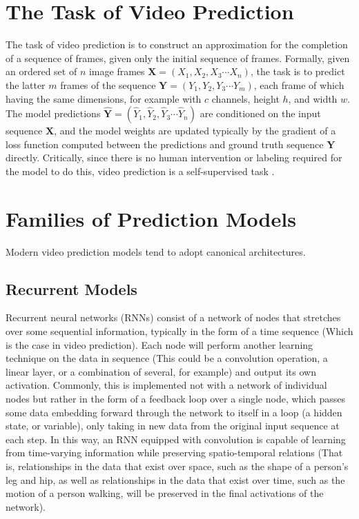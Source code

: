 \documentclass{scrartcl}
\begin{document}
\section{The Task of Video Prediction}
\label{sec:task}

\newcommand{\Xseq}{$\boldsymbol{X} = \left( X_1 , X_2 , X_3 \cdots X_n \right)$}
\newcommand{\Yseq}{$\boldsymbol{Y} = \left( Y_1 , Y_2 , Y_3 \cdots Y_m \right)$}
\newcommand{\Yhatseq}{
	$\hat{\boldsymbol{Y}} = 
	\left( \hat{Y}_1 , \hat{Y}_2 , \hat{Y}_3 \cdots \hat{Y}_n \right)$
}

The task of video prediction is to construct an approximation for the
completion of a sequence of frames, given only the initial sequence of frames.
Formally, given an ordered set of $n$ image frames \Xseq, the task is to
predict the latter $m$ frames of the sequence \Yseq, each frame of which having
the same dimensions, for example with $c$ channels, height $h$, and width $w$.
The model predictions \Yhatseq are conditioned on the input sequence
$\boldsymbol{X}$, and the model weights are updated typically by the gradient
of a loss function computed between the predictions and ground truth sequence
$\boldsymbol{Y}$ directly. Critically, since there is no human intervention or
labeling required for the model to do this, video prediction is a
self-supervised task \cite{video_prediction_survey}.

\section{Families of Prediction Models}
\label{sec:families}

Modern video prediction models tend to adopt canonical architectures.

\subsection{Recurrent Models}
\label{subsec:recurrent}

Recurrent neural networks (RNNs) consist of a network of nodes that stretches
over some sequential information, typically in the form of a time sequence
(Which is the case in video prediction). Each node will perform another
learning technique on the data in sequence (This could be a convolution
operation, a linear layer, or a combination of several, for example) and output
its own activation. Commonly, this is implemented not with a network of
individual nodes but rather in the form of a feedback loop over a single node,
which passes some data embedding forward through the network to itself in a
loop (a hidden state, or variable), only taking in new data from the original
input sequence at each step. In this way, an RNN equipped with convolution is
capable of learning from time-varying information while preserving
spatio-temporal relations (That is, relationships in the data that exist over
space, such as the shape of a person's leg and hip, as well as relationships in
the data that exist over time, such as the motion of a person walking, will be
preserved in the final activations of the network).
\end{document}
